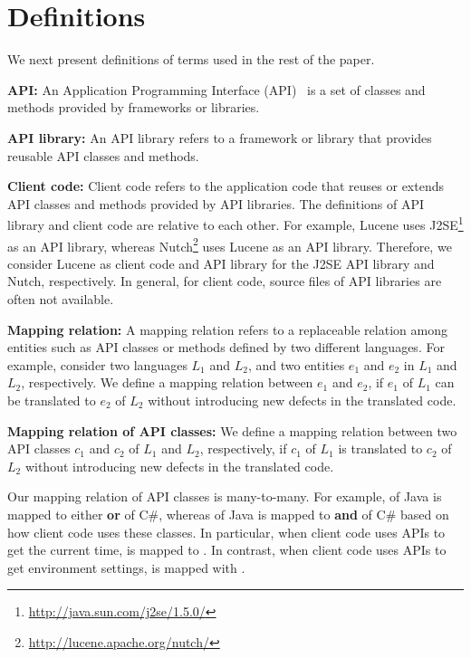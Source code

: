 \section{Definitions}
\label{sec:mapping}

We next present definitions of terms used in the rest of the paper.

\textbf{API:} An Application Programming Interface (API)~\cite{orenstein2000quickstudy}
is a set of classes and methods provided by frameworks or libraries.

\textbf{API library:} An API library refers to a framework
or library that provides reusable API classes and methods.

\textbf{Client code:} Client code refers to the application code
that reuses or extends API classes and methods provided by API
libraries. The definitions of API library and client code are
relative to each other. For example, Lucene uses
J2SE\footnote{\url{http://java.sun.com/j2se/1.5.0/}} as an API
library, whereas Nutch\footnote{\url{http://lucene.apache.org/nutch/}} uses Lucene as
an API library. Therefore, we consider Lucene as client code and API
library for the J2SE API library and Nutch, respectively. In
general, for client code, source files of API libraries are often
not available.

\textbf{Mapping relation:} A mapping relation refers to a
replaceable relation among entities such as API classes or methods
defined by two different languages. For example, consider two
languages $L_1$ and $L_2$, and two entities $e_1$ and $e_2$ in
$L_1$ and $L_2$, respectively. We define a mapping
relation between $e_1$ and $e_2$, if $e_1$ of $L_1$ can be translated to $e_2$ of $L_2$
without introducing new defects in the translated code.

\textbf{Mapping relation of API classes:} We define a mapping
relation between two API classes $c_1$ and $c_2$ of $L_1$ and $L_2$,
respectively, if $c_1$ of $L_1$ is translated to $c_2$ of $L_2$
without introducing new defects in the translated code.

Our mapping relation of API classes is many-to-many. For example,
 of Java is mapped to either
 \textbf{or}
 of C\#, whereas
 of Java is mapped to
 \textbf{and}  of
C\# based on how client code uses these classes. In particular, when
client code uses APIs to get the current time,
 is mapped to . In
contrast, when client code uses APIs to get environment settings,
 is mapped with
.

